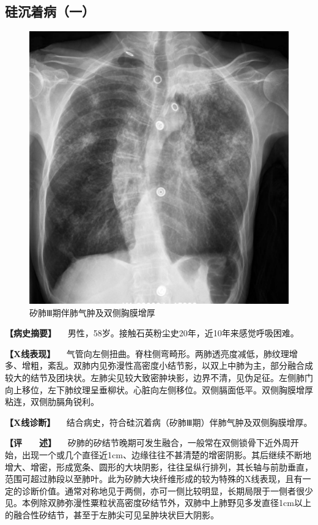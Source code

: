 \subsection{硅沉着病（一）}

\begin{figure}[!htbp]
 \centering
 \includegraphics{./images/Image00178.jpg}
 \captionsetup{justification=centering}
 \caption{矽肺Ⅲ期伴肺气肿及双侧胸膜增厚}
 \label{fig3-9-1}
  \end{figure} 

\textbf{【病史摘要】}
　男性，58岁。接触石英粉尘史20年，近10年来感觉呼吸困难。

\textbf{【X线表现】}
　气管向左侧扭曲。脊柱侧弯畸形。两肺透亮度减低，肺纹理增多、增粗，紊乱。双肺内见弥漫性高密度小结节影，以双上中肺为主，部分融合成较大的结节及团块状。左肺尖见较大致密肿块影，边界不清，见伪足征。左侧肺门向上移位，左下肺纹理呈垂柳状。心脏向左侧移位。双侧膈面低平。双侧胸膜增厚粘连，双侧肋膈角锐利。

\textbf{【X线诊断】}
　结合病史，符合硅沉着病（矽肺Ⅲ期）伴肺气肿及双侧胸膜增厚。

\textbf{【评　　述】}
　矽肺的矽结节晚期可发生融合，一般常在双侧锁骨下近外周开始，出现一个或几个直径近1cm、边缘往往不甚清楚的增密阴影。其后继续不断地增大、增密，形成宽条、圆形的大块阴影，往往呈纵行排列，其长轴与前肋垂直，范围可超过肺段以至肺叶。此为矽肺大块纤维形成的较为特殊的X线表现，且有一定的诊断价值。通常对称地见于两侧，亦可一侧比较明显，长期局限于一侧者很少见。本例除双肺弥漫性粟粒状高密度矽结节外，双肺中上肺野见多发直径1cm以上的融合性矽结节，甚至于左肺尖可见呈肿块状巨大阴影。

